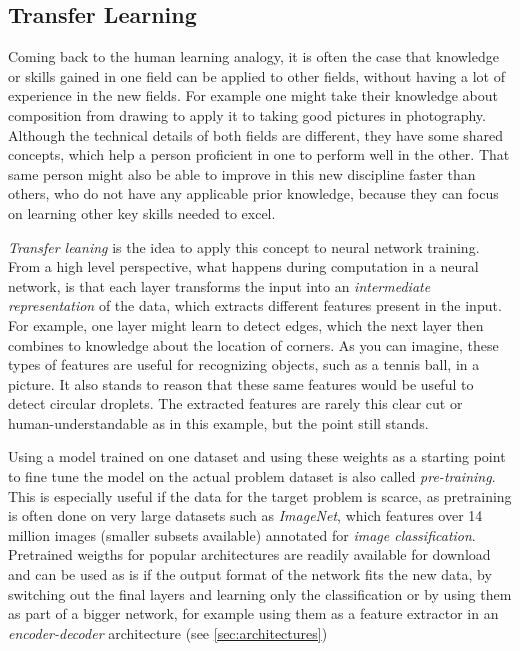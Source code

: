 \subsection{Transfer Learning}
\label{sec:transfer_learning}

Coming back to the human learning analogy, it is often the case that knowledge or skills gained in one field can be applied to other fields, without having a lot of experience in the new fields. For example one might take their knowledge about composition from drawing to apply it to taking good pictures in photography. Although the technical details of both fields are different, they have some shared concepts, which help a person proficient in one to perform well in the other. That same person might also be able to improve in this new discipline faster than others, who do not have any applicable prior knowledge, because they can focus on learning other key skills needed to excel.

\emph{Transfer leaning} is the idea to apply this concept to neural network training. From a high level perspective, what happens during computation in a neural network, is that each layer transforms the input into an \emph{intermediate representation} of the data, which extracts different features present in the input. For example, one layer might learn to detect edges, which the next layer then combines to knowledge about the location of corners. As you can imagine, these types of features are useful for recognizing objects, such as a tennis ball, in a picture. It also stands to reason that these same features would be useful to detect circular droplets. The extracted features are rarely this clear cut or human-understandable as in this example, but the point still stands. 

Using a model trained on one dataset and using these weights as a starting point to fine tune the model on the actual problem dataset is also called \emph{pre-training}. This is especially useful if the data for the target problem is scarce, as pretraining is often done on very large datasets such as \emph{ImageNet}, which features over 14 million images (smaller subsets available) annotated for \emph{image classification}. Pretrained weigths for popular architectures are readily available for download and can be used as is if the output format of the network fits the new data, by switching out the final layers and learning only the classification or by using them as part of a bigger network, for example using them as a feature extractor in an \emph{encoder-decoder} architecture (see \ref{sec:architectures})

